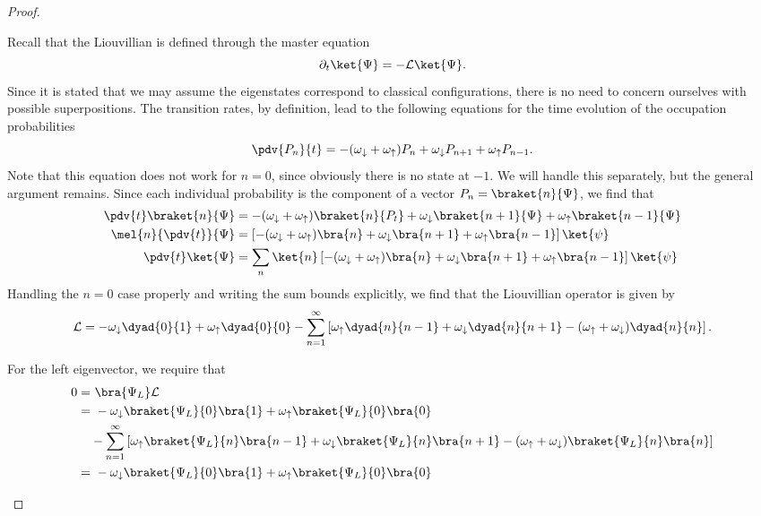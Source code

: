 \begin{proof}
	\begin{parts}
	\item Recall that the Liouvillian is defined through the master equation
		\[
			\partial_t \ket{\Psi} = -\mathcal{L}\ket{\Psi}
		.\] 
		Since it is stated that we may assume the eigenstates correspond to classical configurations, there is no need to concern ourselves with possible superpositions. The transition rates, by definition, lead to the following equations for the time evolution of the occupation probabilities
		\[
			\pdv{P_n}{t} = -(\omega_\downarrow+\omega_\uparrow)P_n + \omega_\downarrow P_{n+1} + \omega_\uparrow P_{n-1}
		.\] 
		Note that this equation does not work for $n=0$, since obviously there is no state at $-1$. We will handle this separately, but the general argument remains. Since each individual probability is the component of a vector $P_n = \braket{n}{\Psi}$, we find that
		\begin{align*}
			\pdv{t}\braket{n}{\Psi} &= -(\omega_\downarrow+\omega_\uparrow)\braket{n}{P_t} + \omega_\downarrow \braket{n+1}{\Psi} + \omega_\uparrow \braket{n-1}{\Psi}\\
			\mel{n}{\pdv{t}}{\Psi} &= \left[-(\omega_\downarrow+\omega_\uparrow)\bra{n} + \omega_\downarrow \bra{n+1} + \omega_\uparrow \bra{n-1}\right]\ket{\psi}\\
			\pdv{t}\ket{\Psi} &= \sum_n\ket{n}\left[-(\omega_\downarrow+\omega_\uparrow)\bra{n} + \omega_\downarrow \bra{n+1} + \omega_\uparrow \bra{n-1}\right]\ket{\psi}
		\end{align*}
		Handling the $n=0$ case properly and writing the sum bounds explicitly, we find that the Liouvillian operator is given by
		\[
			\mathcal{L}=-\omega_{\downarrow}\dyad{0}{1}+\omega_{\uparrow}\dyad{0}{0} - \sum_{n=1}^{\infty} \left[ \omega_{\uparrow}\dyad{n}{n-1} + \omega_{\downarrow}\dyad{n}{n+1} -(\omega_{\uparrow}+\omega_{\downarrow})\dyad{n}{n}\right] 
		.\] 
	\item For the left eigenvector, we require that 
		\begin{align*}
			0 =&~\bra{\Psi_L}\mathcal{L} \\
			=&~-\omega_\downarrow\braket{\Psi_L}{0}\bra{1}+\omega_\uparrow \braket{\Psi_L}{0}\bra{0}\\
			 &-\sum_{n=1}^{\infty}\left[ \omega_\uparrow \braket{\Psi_L}{n}\bra{n-1}+\omega_\downarrow \braket{\Psi_L}{n}\bra{n+1}-(\omega_\uparrow+\omega_\downarrow)\braket{\Psi_L}{n}\bra{n}  \right]\\
			=&~-\omega_\downarrow\braket{\Psi_L}{0}\bra{1}+\omega_\uparrow \braket{\Psi_L}{0}\bra{0}\\

\end{align*}
\end{parts}
\end{proof}
